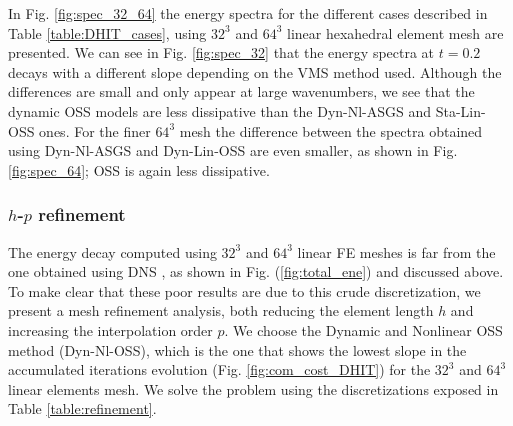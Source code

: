 In Fig. \ref{fig:spec_32_64} the energy spectra for the different cases described in Table \ref{table:DHIT_cases}, using $32^3$ and $64^3$ linear hexahedral element mesh are presented. 
We can see in Fig. \ref{fig:spec_32} that the energy spectra at $t=0.2$ decays with a different slope depending on the VMS method used. Although the differences are small and only appear at large wavenumbers, we see that the dynamic OSS models are less dissipative than the Dyn-Nl-ASGS and Sta-Lin-OSS ones. 
For the finer $64^3$ mesh the difference between the spectra obtained using Dyn-Nl-ASGS and Dyn-Lin-OSS are even smaller, as shown in Fig. \ref{fig:spec_64}; OSS is again less dissipative.


\subsubsection{$h$-$p$ refinement}

The energy decay computed using $32^3$ and $64^3$ linear FE meshes is far from the one obtained using DNS \cite{_selection_????}, as shown in Fig. (\ref{fig:total_ene}) and discussed above. To make clear that these poor results are due to this crude discretization,
we present a mesh refinement analysis, both reducing the element length $h$ and increasing the interpolation order $p$.
We choose the Dynamic and Nonlinear OSS method (Dyn-Nl-OSS), which is the one that shows the lowest slope in the accumulated iterations evolution (Fig. \ref{fig:com_cost_DHIT}) for the $32^3$ and $64^3$ linear elements mesh. We solve the problem using the discretizations exposed in Table \ref{table:refinement}.

